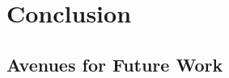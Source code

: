 
\section{Conclusion}\label{sec:conclusion}

\subsection{Avenues for Future Work}\label{subsec:future}